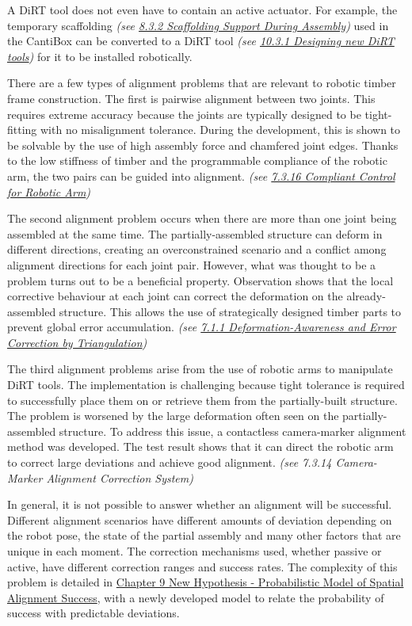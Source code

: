 A DiRT tool does not even have to contain an active actuator. For example, the temporary scaffolding \textit{(see \uline{8.3.2 Scaffolding Support During Assembly})} used in the CantiBox can be converted to a DiRT tool \textit{(see \uline{10.3.1 Designing new DiRT tools}) }for it to be installed robotically.


There are a few types of alignment problems that are relevant to robotic timber frame construction. The first is pairwise alignment between two joints. This requires extreme accuracy because the joints are typically designed to be tight-fitting with no misalignment tolerance. During the development, this is shown to be solvable by the use of high assembly force and chamfered joint edges. Thanks to the low stiffness of timber and the programmable compliance of the robotic arm, the two pairs can be guided into alignment. \textit{(see \uline{7.3.16 Compliant Control for Robotic Arm})}

The second alignment problem occurs when there are more than one joint being assembled at the same time. The partially-assembled structure can deform in different directions, creating an overconstrained scenario and a conflict among alignment directions for each joint pair. However, what was thought to be a problem turns out to be a beneficial property. Observation shows that the local corrective behaviour at each joint can correct the deformation on the already-assembled structure. This allows the use of strategically designed timber parts to prevent global error accumulation. \textit{(see \uline{7.1.1 Deformation-Awareness and Error Correction by Triangulation})}

The third alignment problems arise from the use of robotic arms to manipulate DiRT tools. The implementation is challenging because tight tolerance is required to successfully place them on or retrieve them from the partially-built structure. The problem is worsened by the large deformation often seen on the partially-assembled structure. To address this issue, a contactless camera-marker alignment method was developed. The test result shows that it can direct the robotic arm to correct large deviations and achieve good alignment. \textit{(see 7.3.14 Camera-Marker Alignment Correction System)}

In general, it is not possible to answer whether an alignment will be successful. Different alignment scenarios have different amounts of deviation depending on the robot pose, the state of the partial assembly and many other factors that are unique in each moment. The correction mechanisms used, whether passive or active, have different correction ranges and success rates. The complexity of this problem is detailed in \uline{Chapter 9 New Hypothesis - Probabilistic Model of Spatial Alignment Success}, with a newly developed model to relate the probability of success with predictable deviations.

